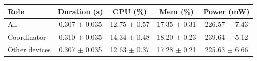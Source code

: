 \begin{tabular}{lcccc}
\hline
\textbf{Role} & \textbf{Duration (s)} & \textbf{CPU (\%)} & \textbf{Mem (\%)} & \textbf{Power (mW)} \\
\hline
All & 0.307 $\pm$ 0.035 & 12.75 $\pm$ 0.57 & 17.35 $\pm$ 0.31 & 226.57 $\pm$ 7.43 \\
Coordinator & 0.310 $\pm$ 0.035 & 14.34 $\pm$ 0.48 & 18.20 $\pm$ 0.23 & 239.64 $\pm$ 5.12 \\
Other devices & 0.307 $\pm$ 0.035 & 12.63 $\pm$ 0.37 & 17.28 $\pm$ 0.21 & 225.63 $\pm$ 6.66 \\
\hline
\end{tabular}
